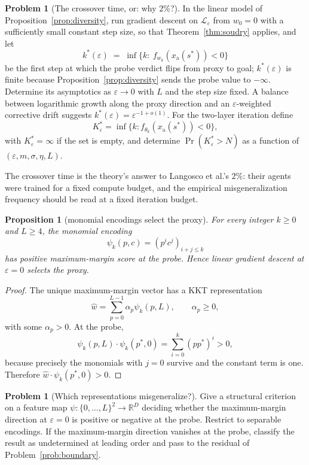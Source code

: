 \documentclass[11pt]{amsart}
\theoremstyle{plain}
\newtheorem{proposition}[theorem]{Proposition}
\theoremstyle{definition}
\newtheorem{problem}[theorem]{Problem}
\begin{document}
\begin{problem}[The crossover time, or: why $2\%$?]\label{prob:crossover}
In the linear model of Proposition~\ref{prop:diversity}, run gradient descent on $\mathcal L_\varepsilon$ from $w_0=0$ with a sufficiently small constant step size, so that Theorem~\ref{thm:soudry} applies, and let
\[
   k^{*}(\varepsilon)\;=\;\inf\{k:\ f_{w_k}(x_{\mathrm a}(s^{*}))<0\}
\]
be the first step at which the probe verdict flips from proxy to goal; $k^{*}(\varepsilon)$ is finite because Proposition~\ref{prop:diversity} sends the probe value to $-\infty$. Determine its asymptotics as $\varepsilon\to0$ with $L$ and the step size fixed. A balance between logarithmic growth along the proxy direction and an $\varepsilon$-weighted corrective drift suggests $k^{*}(\varepsilon)=\varepsilon^{-1+o(1)}$. For the two-layer iteration define
\[
K^*_\varepsilon=\inf\{k:f_{\theta_k}(x_{\mathrm a}(s^*))<0\},
\]
with $K^*_\varepsilon=\infty$ if the set is empty, and determine $\Pr(K^*_\varepsilon>N)$ as a function of $(\varepsilon,m,\sigma,\eta,L)$.
\end{problem}

The crossover time is the theory's answer to Langosco et al.'s $2\%$: their agents were trained for a fixed compute budget, and the empirical misgeneralization frequency should be read at a fixed iteration budget.

\begin{proposition}[monomial encodings select the proxy]\label{prop:monomials}
For every integer $k\ge0$ and $L\ge4$, the monomial encoding
\[
\psi_k(p,c)=(p^ic^j)_{i+j\le k}
\]
has positive maximum-margin score at the probe. Hence linear gradient descent at $\varepsilon=0$ selects the proxy.
\end{proposition}

\begin{proof}
The unique maximum-margin vector has a KKT representation
\[
\widehat w=\sum_{p=0}^{L-1}\alpha_p\psi_k(p,L),
\qquad \alpha_p\ge0,
\]
with some $\alpha_p>0$. At the probe,
\[
\psi_k(p,L)\cdot\psi_k(p^*,0)
=\sum_{i=0}^k(pp^*)^i>0,
\]
because precisely the monomials with $j=0$ survive and the constant term is one. Therefore $\widehat w\cdot\psi_k(p^*,0)>0$.
\end{proof}

\begin{problem}[Which representations misgeneralize?]\label{prob:encodings}
Give a structural criterion on a feature map $\psi:\{0,\dots,L\}^2\to\mathbb R^D$ deciding whether the maximum-margin direction at $\varepsilon=0$ is positive or negative at the probe. Restrict to separable encodings. If the maximum-margin direction vanishes at the probe, classify the result as undetermined at leading order and pass to the residual of Problem~\ref{prob:boundary}.
\end{problem}
\end{document}
